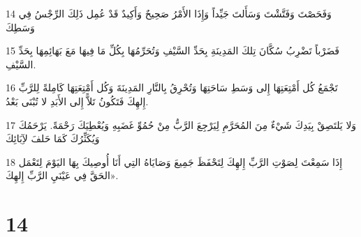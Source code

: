 \par 14 وَفَحَصْتَ وَفَتَّشْتَ وَسَأَلتَ جَيِّداً وَإِذَا الأَمْرُ صَحِيحٌ وَأَكِيدٌ قَدْ عُمِل ذَلِكَ الرِّجْسُ فِي وَسَطِكَ
\par 15 فَضَرْباً تَضْرِبُ سُكَّانَ تِلكَ المَدِينَةِ بِحَدِّ السَّيْفِ وَتُحَرِّمُهَا بِكُلِّ مَا فِيهَا مَعَ بَهَائِمِهَا بِحَدِّ السَّيْفِ.
\par 16 تَجْمَعُ كُل أَمْتِعَتِهَا إِلى وَسَطِ سَاحَتِهَا وَتُحْرِقُ بِالنَّارِ المَدِينَةَ وَكُل أَمْتِعَتِهَا كَامِلةً لِلرَّبِّ إِلهِكَ فَتَكُونُ تَلاًّ إِلى الأَبَدِ لا تُبْنَى بَعْدُ.
\par 17 وَلا يَلتَصِقْ بِيَدِكَ شَيْءٌ مِنَ المُحَرَّمِ لِيَرْجِعَ الرَّبُّ مِنْ حُمُوِّ غَضَبِهِ وَيُعْطِيَكَ رَحْمَةً. يَرْحَمُكَ وَيُكَثِّرُكَ كَمَا حَلفَ لآِبَائِكَ
\par 18 إِذَا سَمِعْتَ لِصَوْتِ الرَّبِّ إِلهِكَ لِتَحْفَظَ جَمِيعَ وَصَايَاهُ التِي أَنَا أُوصِيكَ بِهَا اليَوْمَ لِتَعْمَل الحَقَّ فِي عَيْنَيِ الرَّبِّ إِلهِكَ».

\chapter{14}

